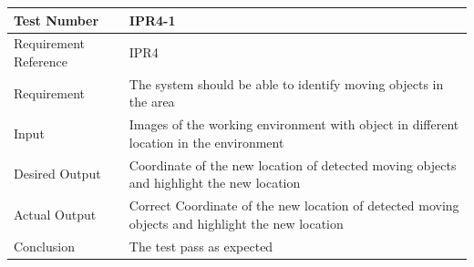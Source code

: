 \documentclass[12pt, titlepage]{article}
\begin{document}
\begin{table}[H]
\begin{center}
\begin{tabular}{|l | m{9cm}|}
\hline
  Test Number & IPR4-1\\
  \hline
  Requirement Reference & IPR4\\
  \hline
  Requirement &  The system should be able to identify moving objects in the area\\
  \hline
  Input & Images of the working environment with object in different location in the environment\\
  \hline
  Desired Output & Coordinate of the new location of detected moving objects and highlight the new location\\
  \hline
  Actual Output & Correct Coordinate of the new location of detected moving objects and highlight the new location\\
  \hline
  Conclusion & The test pass as expected\\
  \hline
\end{tabular}
\end{center}           
\end{table}
\end{document}
